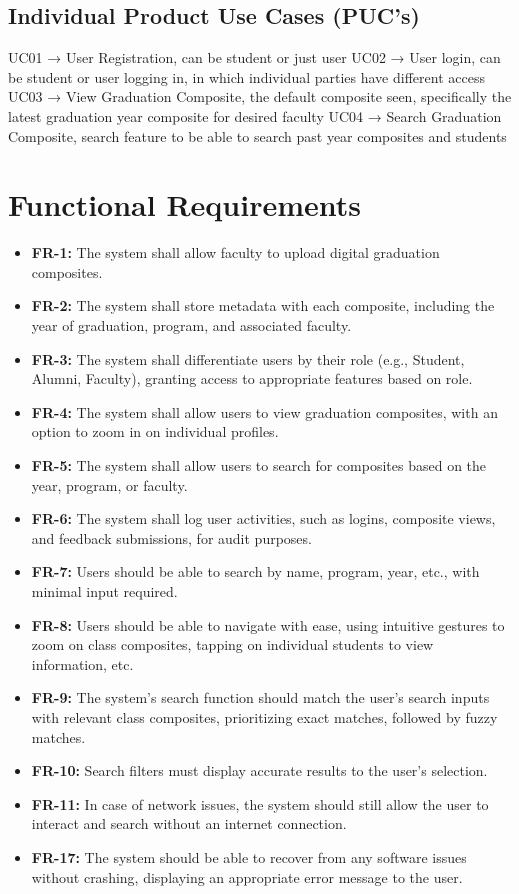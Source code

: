 \documentclass[12pt]{article}
\begin{document}
\subsection{Individual Product Use Cases (PUC's)}
UC01 → User Registration, can be student or just user \newline
UC02 → User login, can be student or user logging in, in which individual parties have different access\newline
UC03 → View Graduation Composite, the default composite seen, specifically the latest graduation year composite for desired faculty\newline
UC04 → Search Graduation Composite, search feature to be able to search past year composites and students\newline

\section{Functional Requirements}

\begin{itemize}
  \item \textbf{FR-1:} The system shall allow faculty to upload digital graduation composites.
  \item \textbf{FR-2:} The system shall store metadata with each composite, including the year of graduation, program, and associated faculty.
  \item \textbf{FR-3:} The system shall differentiate users by their role (e.g., Student, Alumni, Faculty), granting access to appropriate features based on role.
  \item \textbf{FR-4:} The system shall allow users to view graduation composites, with an option to zoom in on individual profiles.
  \item \textbf{FR-5:} The system shall allow users to search for composites based on the year, program, or faculty.
  \item \textbf{FR-6:} The system shall log user activities, such as logins, composite views, and feedback submissions, for audit purposes.
  \item \textbf{FR-7:} Users should be able to search by name, program, year, etc., with minimal input required.
  \item \textbf{FR-8:} Users should be able to navigate with ease, using intuitive gestures to zoom on class composites, tapping on individual students to view information, etc.
  \item \textbf{FR-9:} The system’s search function should match the user’s search inputs with relevant class composites, prioritizing exact matches, followed by fuzzy matches.
  \item \textbf{FR-10:} Search filters must display accurate results to the user’s selection.
  \item \textbf{FR-11:} In case of network issues, the system should still allow the user to interact and search without an internet connection.
  \item \textbf{FR-17:} The system should be able to recover from any software issues without crashing, displaying an appropriate error message to the user.
\end{itemize}
\end{document}
